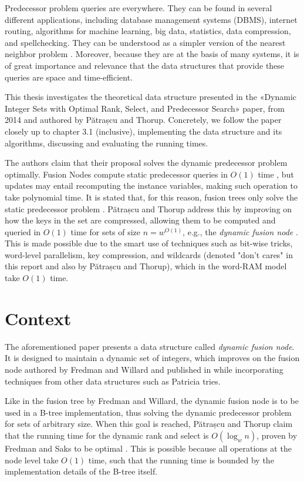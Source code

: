 Predecessor problem queries are everywhere. They can be found in several different applications, including database management systems (DBMS), internet routing, algorithms for machine learning, big data, statistics, data compression, and spellchecking. They can be understood as a simpler version of the nearest neighbor problem \cite{bille2020massive}. Moreover, because they are at the basis of many systems, it is of great importance and relevance that the data structures that provide these queries are space and time-efficient.

This thesis investigates the theoretical data structure presented in the «Dynamic Integer Sets with Optimal Rank, Select, and Predecessor Search» paper, from 2014 and authored by Pătrașcu and Thorup. Concretely, we follow the paper closely up to chapter 3.1 (inclusive), implementing the data structure and its algorithms, discussing and evaluating the running times.

The authors claim that their proposal solves the dynamic predecessor problem optimally.
Fusion Nodes compute static predecessor queries in $O(1)$ time \cite{fredman1993surpassing}, but updates may entail recomputing the instance variables, making such operation to take polynomial time.
It is stated that, for this reason, fusion trees only solve the static predecessor problem \cite{nelsonjelanilec2}.
Pătrașcu and Thorup address this by improving on how the keys in the set are compressed, allowing them to be computed and queried in $O(1)$ time for sets of size $n = w^{O(1)}$, e.g., the \textit{dynamic fusion node} \cite{patrascu2014dynamic}.
This is made possible due to the smart use of techniques such as bit-wise tricks, word-level parallelism, key compression, and wildcards (denoted "don't cares" in this report and also by Pătrașcu and Thorup), which in the word-RAM model take $O(1)$ time.

\section{Context}

The aforementioned paper presents a data structure called \textit{dynamic fusion node}. It is designed to maintain a dynamic set of integers, which improves on the fusion node authored by Fredman and Willard and published in \cite{fredman1993surpassing} while incorporating techniques from other data structures such as Patricia tries.

Like in the fusion tree by Fredman and Willard, the dynamic fusion node is to be used in a B-tree implementation, thus solving the dynamic predecessor problem for sets of arbitrary size. When this goal is reached, Pătrașcu and Thorup claim that the running time for the dynamic rank and select is $O(\log_w n)$, proven by Fredman and Saks to be optimal \cite{fredman1989cell}. This is possible because all operations at the node level take $O(1)$ time, such that the running time is bounded by the implementation details of the B-tree itself.

